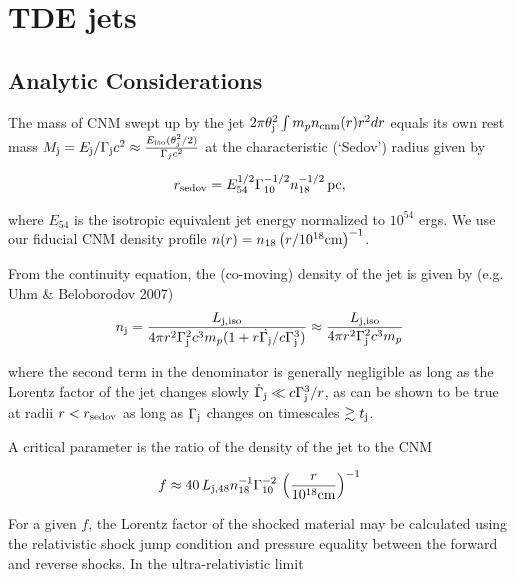 \documentclass[usenatbib,fleqn]{mnras}
\begin{document}
\section{TDE jets}
\label{sec:jet}

\subsection{Analytic Considerations}
\label{sec:analytic}


The mass of CNM swept up by the jet $2\pi\theta_{\rm j}^{2}\int m_p
n_{\rm cnm}(r) r^{2}dr$ equals its own rest mass $M_{\rm j} = E_{\rm
  j}/\Gamma_{\rm j}c^{2} \approx \frac{E_{\rm iso}
  (\theta_j^2/2)}{\Gamma_j c^2} $ at the characteristic (`Sedov')
radius given by

\begin{equation}
r_{\rm sedov} = E_{54}^{1/2} \Gamma_{10}^{-1/2} n_{\rm 18}^{-1/2}\,{\rm pc}, 
\end{equation}

where $E_{54}$ is the isotropic equivalent jet energy normalized to
$10^{54}$ ergs. We use our fiducial CNM density profile $n(r)=n_{18}
\left(r/10^{18} {\rm cm}\right)^{-1}$.

From the continuity equation, the (co-moving) density of the jet is
given by (e.g. Uhm \& Beloborodov 2007)
 \begin{align}
   n_{\rm j} =  \frac{L_{\rm j, iso}}{4 \pi r^{2}\Gamma_{\rm
       j}^{2}c^{3}m_p(1 + r \dot{\Gamma_{\rm j}}/c\Gamma_{\rm j}^{3})}
   \approx  \frac{L_{\rm j, iso}}{4 \pi r^{2}\Gamma_{\rm j}^{2}c^{3}m_p}
\end{align}

where the second term in the denominator is generally negligible as
long as the Lorentz factor of the jet changes slowly
$\dot{\Gamma}_{\rm j} \ll c\Gamma_{\rm j}^{3}/r$, as can be shown to
be true at radii $r < r_{\rm sedov}$ as long as $\Gamma_{\rm j}$
changes on timescales $\gtrsim t_{\rm j}$.

A critical parameter is the ratio of the density of the jet to the
CNM

\begin{equation}
  f\approx 40\,  L_{\rm j,48} n_{18}^{-1} \Gamma_{10}^{-2} \, \left(\frac{r}{10^{18} {\rm
        cm}}\right)^{-1} 
\end{equation}

For a given $f$, the Lorentz factor of the shocked material may be
calculated using the relativistic shock jump condition and pressure
equality between the forward and reverse shocks. In the
ultra-relativistic limit
\end{document}
